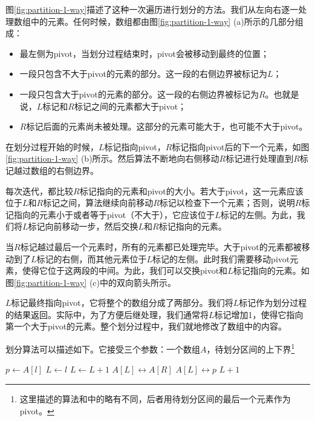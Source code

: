 \documentclass{ctexart}
\begin{document}
图\ref{fig:partition-1-way}描述了这种一次遍历进行划分的方法。我们从左向右逐一处理数组中的元素。任何时候，数组都由图\ref{fig:partition-1-way} (a)所示的几部分组成：

\begin{itemize}
\item 最左侧为pivot，当划分过程结束时，pivot会被移动到最终的位置；
\item 一段只包含不大于pivot的元素的部分。这一段的右侧边界被标记为$L$；
\item 一段只包含大于pivot的元素的部分。这一段的右侧边界被标记为$R$。也就是说，$L$标记和$R$标记之间的元素都大于pivot；
\item $R$标记后面的元素尚未被处理。这部分的元素可能大于，也可能不大于pivot。
\end{itemize}

在划分过程开始的时候，$L$标记指向pivot，$R$标记指向pivot后的下一个元素，如图\ref{fig:partition-1-way} (b)所示。然后算法不断地向右侧移动$R$标记进行处理直到$R$标记越过数组的右侧边界。

每次迭代，都比较$R$标记指向的元素和pivot的大小。若大于pivot，这一元素应该位于$L$和$R$标记之间，算法继续向前移动$R$标记以检查下一个元素；否则，说明$R$标记指向的元素小于或者等于pivot（不大于），它应该位于$L$标记的左侧。为此，我们将$L$标记向前移动一步，然后交换$L$和$R$标记指向的元素。

当$R$标记越过最后一个元素时，所有的元素都已处理完毕。大于pivot的元素都被移动到了$L$标记的右侧，而其他元素位于$L$标记的左侧。此时我们需要移动pivot元素，使得它位于这两段的中间。为此，我们可以交换pivot和$L$标记指向的元素。如图\ref{fig:partition-1-way} (c)中的双向箭头所示。

$L$标记最终指向pivot，它将整个的数组分成了两部分。我们将$L$标记作为划分过程的结果返回。实际中，为了方便后继处理，我们通常将$L$标记增加1，使得它指向第一个大于pivot的元素。整个划分过程中，我们就地修改了数组中的内容。

划分算法可以描述如下。它接受三个参数：一个数组$A$，待划分区间的上下界\footnote{这里描述的算法和\cite{CLRS}中的略有不同，后者用待划分区间的最后一个元素作为pivot。}

\begin{algorithmic}[1]
  \State $p \gets A[l]$  
  \State $L \gets l$ 
   
     
      \State $L \gets L + 1$
      \State {} $A[L] \leftrightarrow A[R]$
    \EndIf
  \EndFor
  \State {} $A[L] \leftrightarrow p$
  \State \Return $L + 1$ 
\EndFunction
\end{algorithmic}
\end{document}
